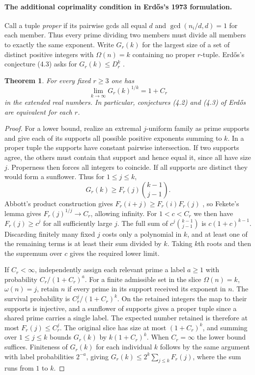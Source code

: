 \documentclass[11pt,a4paper]{article}
\newtheorem{theorem}{Theorem}[section]
\begin{document}
\paragraph{The additional coprimality condition in Erd\H{o}s's 1973 formulation.}
Call a tuple \emph{proper} if its pairwise gcds all equal $d$ and
$\gcd(n_i/d,d)=1$ for each member. Thus every prime dividing two members
must divide all members to exactly the same exponent. Write $G_r(k)$ for
the largest size of a set of distinct positive integers with
$\Omega(n)=k$ containing no proper $r$-tuple. Erd\H{o}s's conjecture
(4.3) asks for $G_r(k)\le D_r^k$ \cite[p.~123]{gcdErdos73}.

\begin{theorem}\label{thm:proper-gcd-capacity}
For every fixed $r\ge3$ one has
\[
 \lim_{k\to\infty}G_r(k)^{1/k}=1+C_r
\]
in the extended real numbers. In particular, conjectures (4.2) and (4.3)
of Erd\H{o}s \cite{gcdErdos73} are equivalent for each $r$.
\end{theorem}
\begin{proof}
For a lower bound, realize an extremal $j$-uniform family as prime
supports and give each of its supports all possible positive exponents
summing to $k$. In a proper tuple the supports have constant pairwise
intersection. If two supports agree, the others must contain that support
and hence equal it, since all have size $j$. Properness then forces all
integers to coincide. If all supports are distinct they would form a
sunflower. Thus for $1\le j\le k$,
\[
 G_r(k)\ge F_r(j)\binom{k-1}{j-1}.
\]
Abbott's product construction gives $F_r(i+j)\ge F_r(i)F_r(j)$
\cite[Thm.~1]{gcdAbbott66}, so Fekete's lemma gives
$F_r(j)^{1/j}\to C_r$, allowing infinity. For $1<c<C_r$ we then have
$F_r(j)\ge c^j$ for all sufficiently large $j$. The full sum of
$c^j\binom{k-1}{j-1}$ is $c(1+c)^{k-1}$. Discarding finitely many
fixed $j$ costs only a polynomial in $k$, and at least one of the
remaining terms is at least their sum divided by $k$. Taking $k$th roots
and then the supremum over $c$ gives the required lower limit.

If $C_r<\infty$, independently assign each relevant prime a label
$a\ge1$ with probability $C_r/(1+C_r)^a$. For a finite admissible set
in the slice $\Omega(n)=k$, $\omega(n)=j$, retain $n$ if every prime
in its support received its exponent in $n$. The survival probability is
$C_r^j/(1+C_r)^k$. On the retained integers the map to their supports is
injective, and a sunflower of supports gives a proper tuple since a
shared prime carries a single label. The expected number retained is
therefore at most $F_r(j)\le C_r^j$. The original slice has size at most
$(1+C_r)^k$, and summing over $1\le j\le k$ bounds $G_r(k)$ by
$k(1+C_r)^k$. When $C_r=\infty$ the lower bound suffices. Finiteness
of $G_r(k)$ for each individual $k$ follows by the same argument with
label probabilities $2^{-a}$, giving $G_r(k)\le2^k\sum_{j\le k}F_r(j)$,
where the sum runs from $1$ to $k$.
\end{proof}
\end{document}
